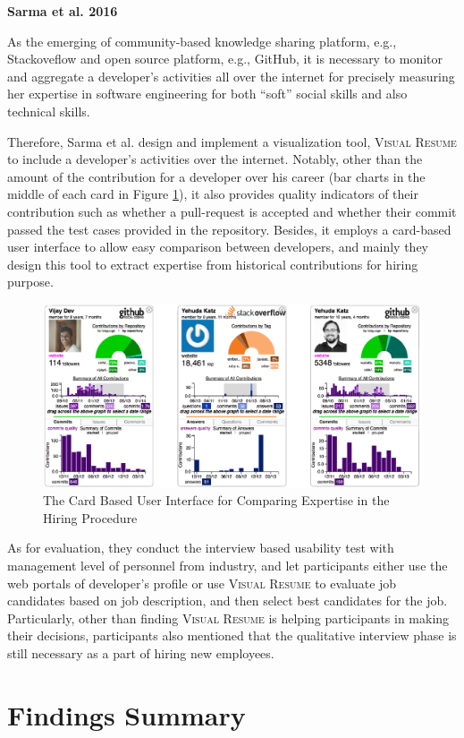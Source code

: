 \textbf{Sarma et al. 2016}

As the emerging of community-based knowledge sharing platform, e.g., Stackoveflow and open source platform, e.g., GitHub, it is necessary to monitor and aggregate a developer's activities all over the internet for precisely measuring her expertise in software engineering for both ``soft'' social skills and also technical skills.

Therefore, Sarma et al. design and implement a visualization tool, \textsc{Visual Resume} to include a developer's activities over the internet. Notably, other than the amount of the contribution for a developer over his career (bar charts in the middle of each card in Figure \ref{vr}), it also provides quality indicators of their contribution such as whether a pull-request is accepted and whether their commit passed the test cases provided in the repository. Besides, it employs a card-based user interface to allow easy comparison between developers, and mainly they design this tool to extract expertise from historical contributions for hiring purpose.

\begin{figure}
\includegraphics[width = 0.8\columnwidth]{vr.pdf}
\centering
\caption{The Card Based User Interface for Comparing Expertise in the Hiring Procedure \cite{hiring2016sarma}}
\label{vr}
\end{figure}

As for evaluation, they conduct the interview based usability test with management level of personnel from industry, and let participants either use the web portals of developer's profile or use \textsc{Visual Resume} to evaluate job candidates based on job description, and then select best candidates for the job. Particularly, other than finding \textsc{Visual Resume} is helping participants in making their decisions, participants also mentioned that the qualitative interview phase is still necessary as a part of hiring new employees.

\section{Findings Summary}

